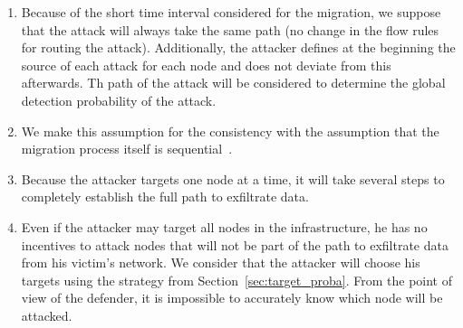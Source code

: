 \begin{enumerate}
    \item Because of the short time interval considered for the migration, we suppose that the attack will always take the same path (\ie no change in the flow rules for routing the attack).
    Additionally, the attacker defines at the beginning the source of each attack for each node and does not deviate from this afterwards.
    Th path of the attack will be considered to determine the global detection probability of the attack.
    
    \item We make this assumption for the consistency with the assumption that the migration process itself is sequential~\cite{Lime-Ghorbani2014}.
    
    \item Because the attacker targets one node at a time, it will take several steps to completely establish the full path to exfiltrate data. 
    
    \item Even if the attacker may target all nodes in the infrastructure, he has no incentives to attack nodes that will not be part of the path to exfiltrate data from his victim's network. We consider that the attacker will choose his targets using the strategy from Section~\ref{sec:target_proba}.
    From the point of view of the defender, it is impossible to accurately know which node will be attacked.
\end{enumerate}



